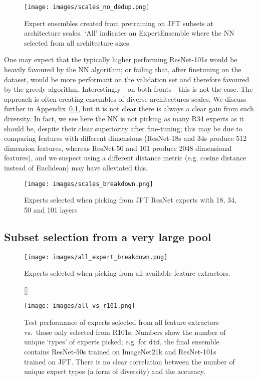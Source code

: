 \documentclass{article} \usepackage{iclr2021_conference,times}
\begin{document}
\begin{figure}[!htb]
    \centering
    \texttt{[image: images/scales\_no\_dedup.png]}
    \caption{Expert ensembles created from pretraining on JFT subsets at architecture scales. `All' indicates an ExpertEnsemble where the NN selected from all architecture sizes.}
    \label{fig:jft_scales}
\end{figure}

One may expect that the typically higher performing ResNet-101s \citep{alex2019big} would be heavily favoured by the NN algorithm; or failing that, after finetuning on the dataset, would be more performant on the validation set and therefore favoured by the greedy algorithm. Interestingly - on both fronts - this is not the case. The approach is often creating ensembles of diverse architectures scales. We discuss further in Appendix~\ref{app:all}, but it is not clear there is always a clear gain from such diversity. In fact, we see here the NN is not picking as many R34 experts as it should be, despite their clear superiority after fine-tuning; this may be due to comparing features with different dimensions (ResNet-18s and 34s produce 512 dimension features, whereas ResNet-50 and 101 produce 2048 dimensional features), and we suspect using a different distance metric (e.g. cosine distance instead of Euclidean) may have alleviated this.

\begin{figure}
    \centering
    \texttt{[image: images/scales\_breakdown.png]}
    \caption{Experts selected when picking from JFT ResNet experts with 18, 34, 50 and 101 layers}
    \label{fig:scales_picked_experts}
\end{figure}






\subsection{Subset selection from a very large pool}
\label{app:all}
\begin{figure}
    \centering
    \texttt{[image: images/all\_expert\_breakdown.png]}
    \caption{Experts selected when picking from all available feature extractors.}
    \label{fig:all_experts_breakdown}
\end{figure}

\begin{figure}
[\FBwidth]
{\caption{Test performance of experts selected from all feature extractors vs.\ those only selected from R101s. Numbers show the number of unique `types' of experts picked; e.g. for \texttt{dtd}, the final ensemble contains ResNet-50s trained on ImageNet21k and ResNet-101s trained on JFT. There is no clear correlation between the number of unique expert types (a form of diversity) and the accuracy.}\label{fig:all_vs_r101}}
{\texttt{[image: images/all\_vs\_r101.png]}}
\end{figure}
\end{document}
